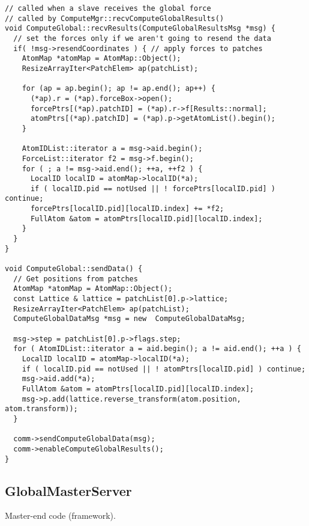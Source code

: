 \documentclass{article}
\begin{document}
\begin{lstlisting}
// called when a slave receives the global force
// called by ComputeMgr::recvComputeGlobalResults()
void ComputeGlobal::recvResults(ComputeGlobalResultsMsg *msg) {
  // set the forces only if we aren't going to resend the data
  if( !msg->resendCoordinates ) { // apply forces to patches
    AtomMap *atomMap = AtomMap::Object();
    ResizeArrayIter<PatchElem> ap(patchList);

    for (ap = ap.begin(); ap != ap.end(); ap++) {
      (*ap).r = (*ap).forceBox->open();
      forcePtrs[(*ap).patchID] = (*ap).r->f[Results::normal];
      atomPtrs[(*ap).patchID] = (*ap).p->getAtomList().begin();
    }

    AtomIDList::iterator a = msg->aid.begin();
    ForceList::iterator f2 = msg->f.begin();
    for ( ; a != msg->aid.end(); ++a, ++f2 ) {
      LocalID localID = atomMap->localID(*a);
      if ( localID.pid == notUsed || ! forcePtrs[localID.pid] ) continue;
      forcePtrs[localID.pid][localID.index] += *f2;
      FullAtom &atom = atomPtrs[localID.pid][localID.index];
    }
  }
}

void ComputeGlobal::sendData() {
  // Get positions from patches
  AtomMap *atomMap = AtomMap::Object();
  const Lattice & lattice = patchList[0].p->lattice;
  ResizeArrayIter<PatchElem> ap(patchList);
  ComputeGlobalDataMsg *msg = new  ComputeGlobalDataMsg;

  msg->step = patchList[0].p->flags.step;
  for ( AtomIDList::iterator a = aid.begin(); a != aid.end(); ++a ) {
    LocalID localID = atomMap->localID(*a);
    if ( localID.pid == notUsed || ! atomPtrs[localID.pid] ) continue;
    msg->aid.add(*a);
    FullAtom &atom = atomPtrs[localID.pid][localID.index];
    msg->p.add(lattice.reverse_transform(atom.position, atom.transform));
  }

  comm->sendComputeGlobalData(msg);
  comm->enableComputeGlobalResults();
}
\end{lstlisting}




\subsection{GlobalMasterServer}


Master-end code (framework).
\end{document}
